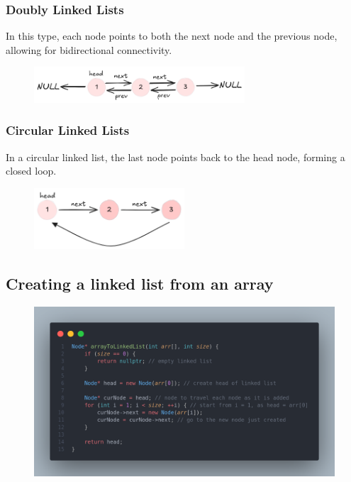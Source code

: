\documentclass[a4paper, 12pt]{book}
\begin{document}
	\subsubsection{Doubly Linked Lists}
	In this type, each node points to both the next node and the previous node, allowing for bidirectional connectivity.
	\begin{figure}[h]
		\vspace{-2mm}
		\centering
		\includegraphics[width=0.7\textwidth]{1to3dll.png}
		\label{fig:1to3dll}
	\end{figure}
	
	\subsubsection{Circular Linked Lists}
	In a circular linked list, the last node points back to the head node, forming a closed loop.
	\begin{figure}[h]
		\vspace{-2mm}
		\centering
		\includegraphics[width=0.5\textwidth]{1to3cll.png}
		\label{fig:1to3cll}
	\end{figure}
	
	\subsection{Creating a linked list from an array}
		\begin{figure}[h]
		\vspace{-2mm}
		\centering
		\includegraphics[width=\textwidth]{ArrToLL.png}
		\label{fig:ArrtoLL}
	\end{figure}
	\newpage
\end{document}
